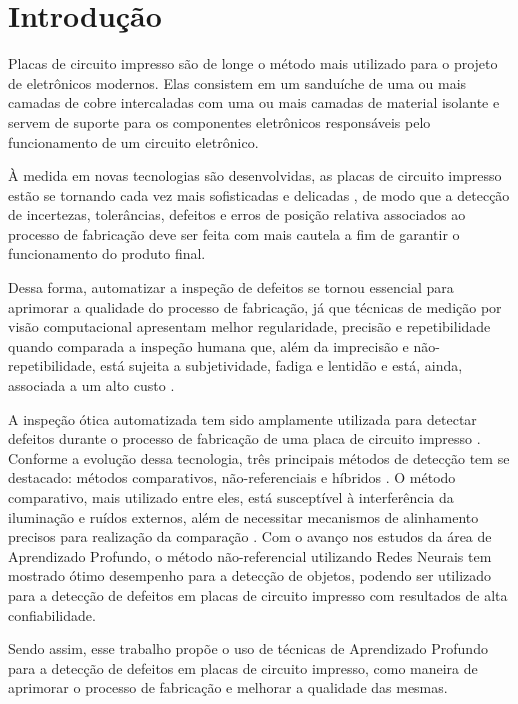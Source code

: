 \chapter{Introdução}
Placas de circuito impresso são de longe o método mais utilizado para o projeto de eletrônicos modernos. Elas consistem em um sanduíche de uma ou mais camadas de cobre intercaladas com uma ou mais camadas de material isolante \cite{ref:Zumbahlen} e servem de suporte para os componentes eletrônicos responsáveis pelo funcionamento de um circuito eletrônico.

À medida em novas tecnologias são desenvolvidas, as placas de circuito impresso estão se tornando cada vez mais sofisticadas e delicadas \cite{ref:Hu-Wang}, de modo que a detecção de incertezas, tolerâncias, defeitos e erros de posição relativa associados ao processo de fabricação \cite{ref:Leta-Feliciano-Martins} deve ser feita com mais cautela a fim de garantir o funcionamento do produto final.

Dessa forma, automatizar a inspeção de defeitos se tornou essencial para aprimorar a qualidade do processo de fabricação, já que técnicas de medição por visão computacional apresentam melhor regularidade, precisão e repetibilidade quando comparada a inspeção humana que, além da imprecisão e não-repetibilidade, está sujeita a subjetividade, fadiga e lentidão e está, ainda, associada a um alto custo \cite{ref:Leta-Feliciano-Martins}.

A inspeção ótica automatizada tem sido amplamente utilizada para detectar defeitos durante o processo de fabricação de uma placa de circuito impresso \cite{ref:Chin-Harlow}. Conforme a evolução dessa tecnologia, três principais métodos de detecção tem se destacado: métodos comparativos, não-referenciais e híbridos \cite{ref:Wu-Wang-Liu}. O método comparativo, mais utilizado entre eles, está susceptível à interferência da iluminação e ruídos externos, além de necessitar mecanismos de alinhamento precisos para realização da comparação \cite{ref:Hu-Wang}. Com o avanço nos estudos da área de Aprendizado Profundo, o método não-referencial utilizando Redes Neurais tem mostrado ótimo desempenho para a detecção de objetos, podendo ser utilizado para a detecção de defeitos em placas de circuito impresso com resultados de alta confiabilidade.

Sendo assim, esse trabalho propõe o uso de técnicas de Aprendizado Profundo para a detecção de defeitos em placas de circuito impresso, como maneira de aprimorar o processo de fabricação e melhorar a qualidade das mesmas.

